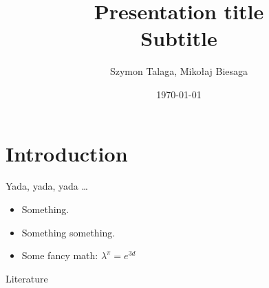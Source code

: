 \title[Presentation]{
    Presentation title \\
    \small{Subtitle}
}
\author{Szymon Talaga, Mikołaj Biesaga} %
\date{\today} %

\frame{\titlepage}

\section{Introduction}

\begin{frame}{Yada, yada, yada \ldots}
\begin{itemize}
    \item Something.
    \item Something something.
    \item Some fancy math: $\lambda^\pi = e^{3d}$
\end{itemize}
\end{frame}

\begin{frame}{Literature}
\nocite{*}
\AtNextBibliography{\footnotesize}
\printbibliography
\end{frame}

